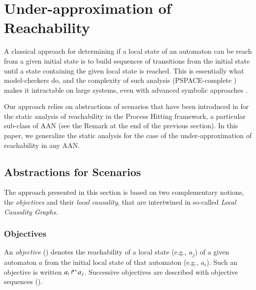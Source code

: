 \section{Under-approximation of Reachability}\label{sec:sa}


A classical approach for determining if a local state of an automaton can be reach from a
given initial state is to build sequences of transitions from the initial state until a state
containing the given local state is reached.
This is essentially what model-checkers do, and the complexity of such analysis (PSPACE-complete
\cite{Harel02}) makes it intractable on large systems, even with advanced symbolic approaches
\cite{PMR12-MSCS}.

Our approach relies on abstractions of scenarios that have been introduced in
\cite{PMR12-MSCS} for the static analysis of reachability in the Process Hitting framework,
a particular sub-class of AAN (see the Remark at the end of the previous section).
In this paper, we generalize the static analysis for the case of the under-approximation of
reachability in any AAN.


\subsection{Abstractions for Scenarios}
\label{ssec:abstr-sce}

The approach presented in this section is based on two complementary notions,
the \emph{objectives} and their \emph{local causality},
that are intertwined in so-called \emph{Local Causality Graphs}.

\subsubsection{Objectives}

An \emph{objective} () denotes the reachability of a local state (e.g., $a_j$) of a given automaton $a$
from the initial local state of that automaton (e.g., $a_i$).
Such an objective is written $\mbox{${a}_{i}\Rsh^*\!{a}_{j}$}$.
Successive objectives are described with objective sequences ().

